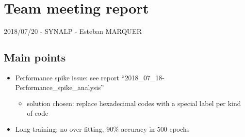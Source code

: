 \section*{Team meeting report}

2018/07/20 - SYNALP - Esteban MARQUER

\subsection{Main points}

\begin{itemize}
\item
  Performance spike issue: see report
  ``2018\_07\_18-Performance\_spike\_analysis''

  \begin{itemize}
  \item
    solution chosen: replace hexadecimal codes with a special label per
    kind of code
  \end{itemize}
\item
  Long training: no over-fitting, 90\% accuracy in 500 epochs


\end{itemize}
